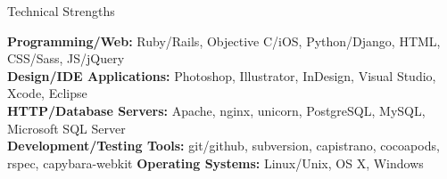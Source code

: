 \documentclass{resume} %
\begin{document}

\begin{rSection}{Technical Strengths}

\textbf{Programming/Web:} Ruby/Rails, Objective C/iOS, Python/Django, HTML, CSS/Sass, JS/jQuery \\
\textbf{Design/IDE Applications:} Photoshop, Illustrator, InDesign, Visual Studio, Xcode, Eclipse  \\
\textbf{HTTP/Database Servers:} Apache, nginx, unicorn, PostgreSQL, MySQL, Microsoft SQL Server  \\
\textbf{Development/Testing Tools:} git/github, subversion, capistrano, cocoapods, rspec, capybara-webkit
\textbf{Operating Systems:} Linux/Unix, OS X, Windows

\end{rSection}

\end{document}
